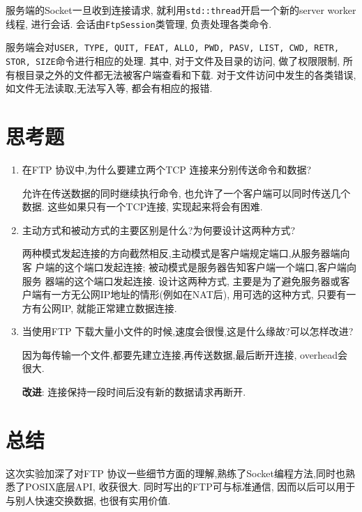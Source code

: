 服务端的Socket一旦收到连接请求, 就利用\verb|std::thread|开启一个新的server worker线程, 进行会话.
会话由\verb|FtpSession|类管理, 负责处理各类命令.

服务端会对\verb|USER, TYPE, QUIT, FEAT, ALLO, PWD, PASV, LIST, CWD, RETR, STOR, SIZE|命令进行相应的处理.
其中, 对于文件及目录的访问, 做了权限限制, 所有根目录之外的文件都无法被客户端查看和下载.
对于文件访问中发生的各类错误, 如文件无法读取,无法写入等, 都会有相应的报错.



\section{思考题}
\begin{enumerate}

    \item 在FTP 协议中,为什么要建立两个TCP 连接来分别传送命令和数据?

    允许在传送数据的同时继续执行命令, 也允许了一个客户端可以同时传送几个数据.
    这些如果只有一个TCP连接, 实现起来将会有困难.


\item 主动方式和被动方式的主要区别是什么?为何要设计这两种方式?

两种模式发起连接的方向截然相反,主动模式是客户端规定端口,从服务器端向客
户端的这个端口发起连接; 被动模式是服务器告知客户端一个端口,客户端向服务
器端的这个端口发起连接.
设计这两种方式, 主要是为了避免服务器或客户端有一方无公网IP地址的情形(例如在NAT后),
用可选的这种方式, 只要有一方有公网IP, 就能正常建立数据连接.

\item 当使用FTP 下载大量小文件的时候,速度会很慢,这是什么缘故?可以怎样改进?

因为每传输一个文件,都要先建立连接,再传送数据,最后断开连接, overhead会很大.

\textbf{改进}: 连接保持一段时间后没有新的数据请求再断开.
\end{enumerate}

\section{总结}
这次实验加深了对FTP 协议一些细节方面的理解,熟练了Socket编程方法,同时也熟悉了POSIX底层API, 收获很大.
同时写出的FTP可与标准通信, 因而以后可以用于与别人快速交换数据, 也很有实用价值.
